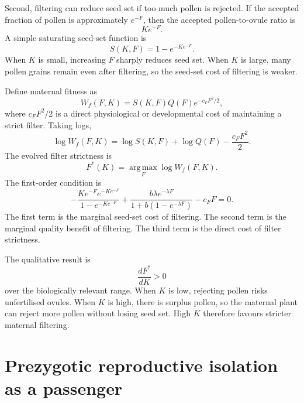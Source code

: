 \documentclass[11pt]{article}
\newcommand{\argmax}{\operatorname*{arg\,max}}
\begin{document}
Second, filtering can reduce seed set if too much pollen is rejected. If the accepted fraction of pollen is approximately \(e^{-F}\), then the accepted pollen-to-ovule ratio is
\begin{equation}
Ke^{-F}.
\end{equation}
A simple saturating seed-set function is
\begin{equation}
S(K,F)=1-e^{-Ke^{-F}}.
\end{equation}
When \(K\) is small, increasing \(F\) sharply reduces seed set. When \(K\) is large, many pollen grains remain even after filtering, so the seed-set cost of filtering is weaker.

Define maternal fitness as
\begin{equation}
W_f(F,K)=S(K,F)Q(F)e^{-c_FF^2/2},
\label{eq:maternal_fitness}
\end{equation}
where \(c_FF^2/2\) is a direct physiological or developmental cost of maintaining a strict filter. Taking logs,
\begin{equation}
\log W_f(F,K)=\log S(K,F)+\log Q(F)-\frac{c_FF^2}{2}.
\end{equation}
The evolved filter strictness is
\begin{equation}
F^*(K)=\argmax_F \log W_f(F,K).
\label{eq:Fstar}
\end{equation}
The first-order condition is
\begin{equation}
-
\frac{Ke^{-F}e^{-Ke^{-F}}}{1-e^{-Ke^{-F}}}
+
\frac{b\lambda e^{-\lambda F}}{1+b(1-e^{-\lambda F})}
-
c_FF
=0.
\label{eq:Fstar_condition}
\end{equation}
The first term is the marginal seed-set cost of filtering. The second term is the marginal quality benefit of filtering. The third term is the direct cost of filter strictness.

The qualitative result is
\begin{equation}
\frac{dF^*}{dK}>0
\label{eq:F_increases_with_K}
\end{equation}
over the biologically relevant range. When \(K\) is low, rejecting pollen risks unfertilised ovules. When \(K\) is high, there is surplus pollen, so the maternal plant can reject more pollen without losing seed set. High \(K\) therefore favours stricter maternal filtering.

\section{Prezygotic reproductive isolation as a passenger}
\end{document}
